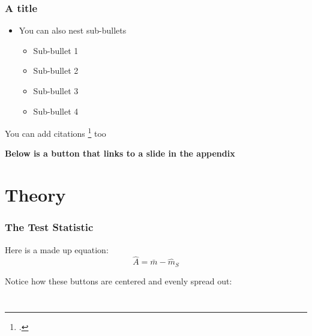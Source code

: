\documentclass[
    11pt, %
    aspectratio=169, %
]{beamer}
\begin{document}
\begin{frame}
\label{Test} %
	\frametitle{A title}

        \begin{itemize}
            \item You can also nest sub-bullets
            \begin{itemize}
                \item Sub-bullet 1
                \item Sub-bullet 2
                \item Sub-bullet 3
                \item Sub-bullet 4 \newline
            \end{itemize}
        \end{itemize}

        You can add citations \footcite{Tjøstheim} too\newline

        \textbf{Below is a button that links to a slide in the appendix}
        
        \begin{center}
            \hyperlink{Figure}{}    
        \end{center}
\end{frame}

\section{Theory}

\begin{frame}
\label{Test Stat}
	\frametitle{The Test Statistic}
		
        Here is a made up equation:
        $$ \hat{A} = \bar{m}-\hat{m}_S$$ \newline

        Notice how these buttons are centered and evenly spread out:\newline

        \begin{columns}[t] %
		\begin{column}{0.25\textwidth} %
                \hyperlink{Terms}{}
		\end{column}
  		\begin{column}{0.25\textwidth} %
                \hyperlink{Definitions}{}
		\end{column}
            \begin{column}{0.25\textwidth} %
                \hyperlink{Theorems}{}
		\end{column}
	\end{columns}
        
\end{frame}
\end{document}

